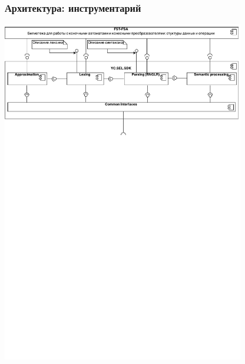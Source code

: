 \documentclass{beamer}
\begin{document}
\begin{frame}
    \transwipe[direction=90]
    \frametitle{Архитектура: инструментарий}
    \begin{center}
        \includegraphics[width=300pt]{pictures/Components.pdf}
    \end{center}
\end{frame}
\end{document}
